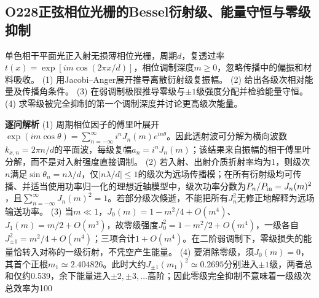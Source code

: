 \subsection*{O228\quad 正弦相位光栅的Bessel衍射级、能量守恒与零级抑制}
单色相干平面光正入射无损薄相位光栅，周期$d$，复透过率$t(x)=\exp[i m\cos(2\pi x/d)]$，相位调制深度$m\ge0$，忽略传播中的偏振和材料吸收。
(1) 用Jacobi–Anger展开推导离散衍射级复振幅。
(2) 给出各级次相对能量及传播角条件。
(3) 在弱调制极限推导零级与$\pm1$级强度分配并检验能量守恒。
(4) 求零级被完全抑制的第一个调制深度并讨论更高级次能量。
\par\textbf{逐问解析}
(1) 周期相位因子的傅里叶展开$\exp(im\cos\theta)=\sum_{n=-\infty}^\infty i^nJ_n(m)e^{in\theta}$。因此透射波可分解为横向波数$k_{x,n}=2\pi n/d$的平面波，每级复幅$a_n=i^nJ_n(m)$；该结果来自振幅的相干傅里叶分解，而不是对入射强度直接调制。
(2) 若入射、出射介质折射率均为1，则级次$n$满足$\sin\theta_n=n\lambda/d$，仅$|n\lambda/d|\le1$的级次为远场传播模；在所有衍射级均可传播、并适当使用功率归一化的理想近轴模型中，级次功率分数为$P_n/P_{\rm in}=J_n(m)^2$，且$\sum_{n=-\infty}^\infty J_n(m)^2=1$。若部分级次倏逝，不能把所有$J_n^2$无修正地解释为远场输送功率。
(3) 当$m\ll1$，$J_0(m)=1-m^2/4+O(m^4)$、$J_1(m)=m/2+O(m^3)$，故零级强度$J_0^2=1-m^2/2+O(m^4)$，一级各自$J_{\pm1}^2=m^2/4+O(m^4)$；三项合计$1+O(m^4)$。在二阶弱调制下，零级损失的能量恰转入对称的一级衍射，不凭空产生能量。
(4) 要消除零级，须$J_0(m)=0$，其首个正根$m_1\simeq2.404826$。此时大约$J_{\pm1}(m_1)^2\simeq0.2695$分别进入$\pm1$级，两者总和仅约0.539，余下能量进入$\pm2,\pm3,\ldots$高阶；因此零级完全抑制不意味着一级级次总效率为100%
\par\medskip
